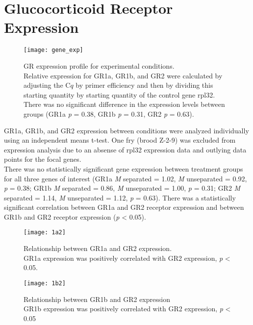 \documentclass[12pt,twoside]{reedthesis}
\begin{document}
\section{Glucocorticoid Receptor Expression}

\begin{figure}[htbp] 
\begin{center} 
\texttt{[image: gene\_exp]}
\caption[GR expression profile for experimental
conditions]{\footnotesize{GR expression profile for experimental
      conditions.\\ Relative expression for GR1a, GR1b, and GR2 were calculated
  by adjusting the C$q$ by primer efficiency and then by dividing this starting
  quantity by starting quantity of the control gene rpl32. There was no
  significant difference in the expression levels between groups (GR1a
  \textit{p} = 0.38, GR1b \textit{p} = 0.31, GR2 \textit{p} = 0.63).}}
\label{subd}
\end{center} 
\end{figure}

 GR1a, GR1b, and GR2 expression between conditions were analyzed individually using an independent means
t-test. One fry (brood Z-2-9) was excluded from expression analysis due to an
absense of rpl32 expression data and outlying data points for the focal genes.\\
There was no statistically significant gene expression between treatment groups
for all three genes of interest (GR1a \textit{M} separated = 1.02, \textit{M}
unseparated = 0.92, \textit{p} = 0.38; GR1b \textit{M} separated = 0.86, \textit{M}
unseparated = 1.00, \textit{p} = 0.31; GR2 \textit{M} separated = 1.14, \textit{M}
unseparated = 1.12, \textit{p} = 0.63). There was a statistically significant
correlation between GR1a and GR2 receptor expression and between GR1b and GR2
receptor expression (\textit{p} < 0.05).

\begin{figure}[htbp] 
\begin{center} 
\texttt{[image: 1a2]}
\caption[Relationship between GR1a and GR2
expression]{\footnotesize{Relationship between GR1a and GR2 expression.\\ GR1a
    expression was positively correlated with GR2 expression, \textit{p} < 0.05.}}
\label{subd}
\end{center} 
\end{figure}

\begin{figure}[htbp] 
\begin{center} 
\texttt{[image: 1b2]}
\caption[Relationship between GR1b and GR2
expression]{\footnotesize{Relationship between GR1b and GR2 expression\\ GR1b
    expression was positively correlated with GR2 expression, \textit{p} < 0.05}}
\label{subd}
\end{center} 
\end{figure}
\end{document}
